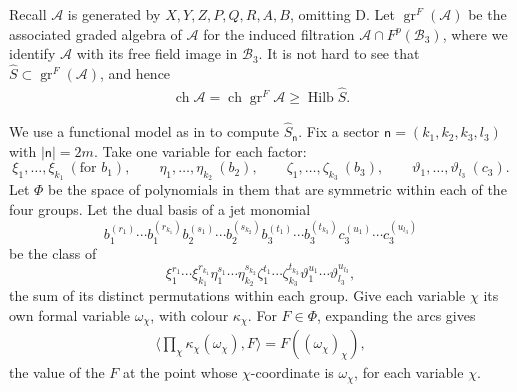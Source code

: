 \documentclass[11pt]{amsart}
\theoremstyle{definition}
\theoremstyle{remark}
\DeclareMathOperator{\gr}{gr}
\DeclareMathOperator{\ch}{ch}
\newcommand{\B}{\mathcal B}
\begin{document}
Recall $\mathcal{A}$ is generated by $X,Y,Z,P,Q,R,A,B$, omitting D. Let $\gr^F(\mathcal{A})$ be the associated graded algebra of $\mathcal{A}$ for the induced filtration $\mathcal{A}\cap F^p(\B_3)$, where we identify $\mathcal{A}$ with its free field image in $\B_3$. It is not hard to see that $\widehat{S}\subset \gr^F(\mathcal{A})$, and hence
\begin{align}\label{formula:lowerboundA}
	\ch\mathcal{A}=\ch\gr^F\mathcal{A} \geq \operatorname{Hilb}\widehat{S}.
\end{align}

We use a functional model as in \cite{FS} to compute $\widehat{S}_{\mathsf n}$. Fix a sector $\mathsf n=(k_1,k_2,k_3,l_3)$ with $|\mathsf{n}|=2m$. Take one variable for each factor:  
\[
\xi_1,\dots,\xi_{k_1}\ (\text{for }b_1),\qquad\eta_1,\dots,\eta_{k_2}\ (b_2),\qquad\zeta_1,\dots,\zeta_{k_3}\ (b_3),
\qquad\vartheta_1,\dots,\vartheta_{l_3}\ (c_3).
\]
Let $\Phi$ be the space of polynomials in them that are symmetric within each of the four groups. Let the dual basis of a jet monomial \[b_1^{(r_1)}\cdots b_1^{(r_{k_1})}b_2^{(s_1)}\cdots b_2^{(s_{k_2})}b_3^{(t_1)}\cdots b_3^{(t_{k_3})}c_3^{(u_1)}\cdots c_3^{(u_{l_3})} \] be the class of 
\[ \xi_1^{r_1}\cdots \xi_{k_1}^{r_{k_1}}\eta_1^{s_1}\cdots \eta_{k_2}^{s_{k_2}}\zeta_{1}^{t_1}\cdots \zeta_{k_3}^{t_{k_3}}\vartheta_{1}^{u_1}\cdots \vartheta_{l_3}^{u_{l_3}},\]
the sum of its distinct permutations within each group. Give each variable $\chi$ its own formal variable $\omega_\chi$, with colour $\kappa_\chi$. For $F\in \Phi$, expanding the arcs gives 
\begin{align}\label{formula: functional} \langle \prod_{\chi} \kappa_\chi(\omega_{\chi}),F\rangle=F((\omega_\chi)_{\chi}),\end{align}
  the value of the $F$ at the point whose $\chi$-coordinate is $\omega_\chi$, for each variable $\chi$. 
  
\end{document}
